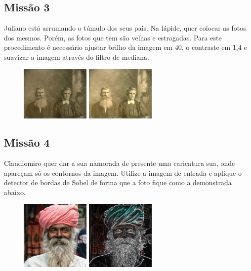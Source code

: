 \documentclass[
	12pt,				%
	oneside,			%
	a4paper,			%
	english,			%
	french,				%
	spanish,			%
	brazil,				%
	]{abntex2}
\begin{document}
\begin{apendicesenv}
\subsection{Missão 3}

Juliano está arrumando o túmulo dos seus pais. Na lápide, quer colocar as fotos dos mesmos. Porém, as fotos que tem são velhas e estragadas. Para este procedimento é necessário ajustar  brilho da imagem em 40, o contraste em 1,4 e suavizar a imagem através do filtro de mediana.

\begin{figure}[H]
\centering
\includegraphics[width=0.3\textwidth]{imagens/desafioestudio/mission3_input.jpg}
\includegraphics[width=0.3\textwidth]{imagens/desafioestudio/mission3_output.png}
\end{figure}

\subsection{Missão 4}

Claudiomiro quer dar a sua namorada de presente uma caricatura sua, onde apareçam só os contornos da imagem. Utilize a imagem de entrada e aplique o detector de bordas de Sobel de forma que a foto fique como a demonstrada abaixo.

\begin{figure}[H]
\centering
\includegraphics[width=0.3\textwidth]{imagens/desafioestudio/mission4_input.jpg}
\includegraphics[width=0.3\textwidth]{imagens/desafioestudio/mission4_output.png}
\end{figure}


\end{apendicesenv}
\end{document}
